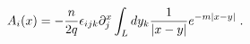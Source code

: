 \begin{equation}
A_{i}(x)=-\frac{n}{2q}\epsilon _{ijk}\partial _{j}^{x}\int_{L}dy_{k}\frac{1}{%
\left| x-y\right| }e^{-m\left| x-y\right| }\;.  \label{aif}
\end{equation}

